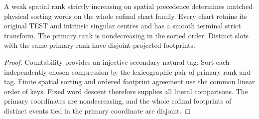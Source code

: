 \begin{theorem}
\label{hir:g8-matched-cofinal-weak-rank-words}
\leanok
A weak spatial rank strictly increasing on spatial precedence
determines matched physical sorting words on the whole cofinal
chart family. Every chart retains its original TEST and intrinsic
singular centres and has a smooth terminal strict transform.
The primary rank is nondecreasing in the sorted order. Distinct
slots with the same primary rank have disjoint projected footprints.
\end{theorem}
\begin{proof}
Countability provides an injective secondary natural tag. Sort
each independently chosen compression by the lexicographic pair
of primary rank and tag. Finite spatial sorting and ordered
footprint agreement use the common linear order of keys. Fixed
word descent therefore supplies all literal comparisons. The
primary coordinates are nondecreasing, and the whole cofinal
footprints of distinct events tied in the primary coordinate
are disjoint.
\end{proof}

